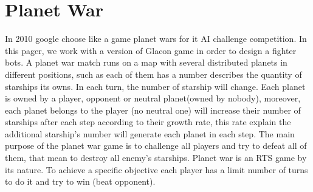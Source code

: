 \documentclass[conference]{IEEEtran}
\begin{document}
\section{Planet War}
In 2010 google choose like a game planet wars for it AI challenge competition. In this pager, we work with a version of Glacon game in order to design a fighter bots. A planet war match\cite{doc1} runs on a map with several distributed planets in different positions, such as each of them has a number describes the quantity of starships its owns. In each turn, the number of starship will change. Each planet is owned by a player, opponent or neutral planet(owned by nobody), moreover, each planet belongs to the player (no neutral one) will increase their number of starships after each step according to their growth rate, this rate explain the additional starship's number will generate each planet in each step.
The main purpose of the planet war game\cite{doc1} is to challenge all players and try to defeat all of them, that mean to destroy all enemy's starships. Planet war is an RTS game by its nature. To achieve a specific objective each player has a limit number of turns to do it and try to win (beat opponent).  \\
\end{document}
